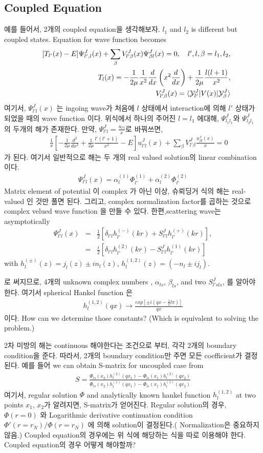 \documentclass[10pt]{book}
\newcommand{\bea}{\begin{eqnarray}}
\newcommand{\eea}{\end{eqnarray}}
\newcommand{\no}{\nonumber \\}
\def\la{\langle}
\def\ra{\rangle}
\begin{document}
\subsection{Coupled Equation}
예를 들어서, 2개의 coupled equation을 생각해보자.
$l_1$ and $l_2$ is different but coupled states.
Equation for wave function becomes
\bea
& &[T_{l'}(x)-E]\Psi^J_{l', l}(x)
+\sum_{\beta} V^J_{l'\beta}(x)\Psi^J_{\beta  l}(x)=0,
\quad\mbox{$l',l,\beta=l_1,l_2$},
\no
& &T_{l}(x)=-\frac{1}{2\mu}\frac{1}{x^2}\frac{d}{dx}
  \left(x^2\frac{d}{dx}\right)+\frac{1}{2\mu}\frac{l(l+1)}{x^2},\no
& & V^J_{l'\beta}(x)=\la {\cal Y}^J_{l'}|V(x)|{\cal Y}^J_{\beta}\ra
\eea
여기서, $\Psi^J_{l' l}(x)$ 는 ingoing wave가 처음에 $l$ 
상태에서 interaction에 의해 $l'$ 상태가 되었을 때의 wave function 이다.
위식에서 하나의 주어진 $l=l_1$ 에대해, $\Psi^J_{l_1 l_1}$와
$\Psi^J_{l_2 l_1}$ 의 두개의 해가 존재한다.
만약, $\Psi^J_{l'l}=\frac{u_{l'l}}{x}$로
바꿔쓰면,
\bea
& & \frac{1}{x}\left[-\frac{1}{2\mu}\frac{d^2}{dx^2} 
                +\frac{1}{2\mu}\frac{l'(l'+1)}{x^2} 
                -E\right] u^J_{l'l}(x)
    +\sum_{\beta}V^J_{l'\beta}\frac{u^J_{\beta l}(x)}{x}=0                              
\eea
가 된다. 여기서 일반적으로 해는 두 개의 real valued solution의 linear 
combination이다.
\bea
\Psi^J_{l'l}(x)=\alpha_{l}^{(1)}\Phi^{(1)}_{l'}
               +\alpha_{l}^{(2)}\Phi^{(2)}_{l'}  
\eea
Matrix element of potential 이 complex 가 아닌 이상,
슈뢰딩거 식의 해는 real-valued 인 것만 풀면 된다. 그리고,
complex normalization factor를 곱하는 것으로 complex velued
wave function 을 만들 수 있다. 
한편,scattering wave는  asymptotically 
\bea
\Psi^J_{l'l}(x)&=&\frac{1}{2}[\delta_{l' l} h_{l'}^{(-)}(kr)
                           +S^J_{l' l}h_{l'}^{(+)}(kr)],\no
               &=&\frac{i}{2}[\delta_{l' l} h_{l'}^{(2)}(kr)
                           -S^J_{l' l}h_{l'}^{(1)}(kr)]              
\eea
with $h^{(\pm)}_{l}(z)=j_l(z)\pm i n_{l}(z)$,
$h^{(1,2)}_{l}(z)=(-n_l\pm i j_l)$. 

로 써지므로, 4개의 unknown complex numbers , 
$\alpha_{ls}$, $\beta_{ls}$, and two $S^J_{l' s ls}$,
를 알아야한다. 여기서 spherical Hankel function 은
\bea
h^{(1,2)}_{l}(qx)\to \frac{exp[\pm i(qx-\frac{1}{2}l\pi)]}{qx}
\eea 
이다. How can we determine those constants? (Which is equivalent to solving the problem.)

2차 미방의 해는 continuous 해야한다는 조건으로 부터, 각각 2개의 boundary condition을 준다.
따라서, 2개의 boundary condition만 주면 모든 coefficient가 결정된다. 
예를 들어 
we can obtain S-matrix for uncoupled case from
\bea
S=\frac{\Phi_{ls}(x_2)h_l^{(2)}(qx_1)-\Phi_{ls}(x_1)h_l^{(2)}(qx_2)}
     {\Phi_{ls}(x_2)h_l^{(1)}(qx_1)-\Phi_{ls}(x_1)h_l^{(1)}(qx_2)}
\eea
여기서, regular solution $\Phi$ and analytically known hankel function $h_l^{(1,2)}$
at two points $x_1$, $x_2$가 알려지면, S-matrix가 얻어진다. Regular solution의 경우,
$\Phi(r=0)$ 와 Logarithmic derivative continuation condition
$\Phi'(r=r_N)/\Phi(r=r_N)$ 에 의해 solution이 결정된다.( Normalization은 중요하지 않음.)  
Coupled equation의 경우에는 위 식에 해당하는 식을 따로 이용해야 한다.
Coupled equation의 경우 어떻게 해야할까?
\end{document}
